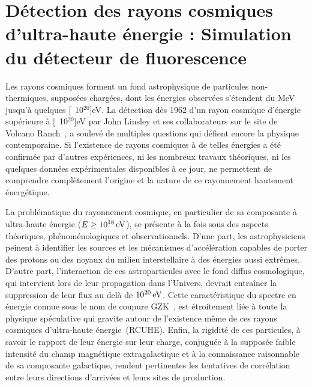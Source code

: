 \documentclass[10pt,a4paper,twoside]{report}
\begin{document}
\renewcommand{\chaptername}{Projet}

\setcounter{chapter}{3}
\chapter{Détection des rayons cosmiques d'ultra-haute énergie :
  Simulation du détecteur de fluorescence}
\label{projet::opa1}

Les rayons cosmiques forment un fond astrophysique de particules
non-thermiques, supposées chargées, dont les énergies observées
s'étendent du MeV jusqu'à quelques \unit[10$^\text{20}$]{eV}. La détection
dès 1962 d'un rayon cosmique d'énergie supérieure à
\unit[10$^\text{20}$]{eV} par John Linsley et ses collaborateurs sur le
site de Volcano Ranch~\cite{linsley}, a soulevé de
multiples questions qui défient encore la physique contemporaine. Si
l'existence de rayons cosmiques à de telles énergies a été confirmée
par d'autres expériences, ni les nombreux travaux théoriques, ni les
quelques données expérimentales disponibles à ce jour, ne permettent
de comprendre complètement l'origine et la nature de ce rayonnement
hautement énergétique.

La problématique du rayonnement cosmique, en particulier de sa
composante à ultra-haute énergie ($E\geq\unit[10^{18}]{eV}$), se
présente à la fois sous des aspects théoriques,
phé\-no\-mé\-no\-lo\-gi\-ques et observationnels. D'une part, les
astrophysiciens peinent à identifier les sources et les mécanismes
d'accélération capables de porter des protons ou des noyaux du milieu
interstellaire à des énergies aussi extrêmes. D'autre part,
l'interaction de ces astroparticules avec le fond diffus cosmologique,
qui intervient lors de leur propagation dans l'Univers, devrait
entraîner la suppression de leur flux au delà de
$\unit[10^{20}]{eV}$. Cette caractéristique du spectre en énergie
connue sous le nom de coupure GZK~\cite{greisen, zatsepin}, est
étroitement liée à toute la physique spéculative qui gravite autour de
l'existence même de ces rayons cosmiques d'ultra-haute
énergie~(RCUHE). Enfin, la rigidité de ces particules, à savoir le
rapport de leur énergie sur leur charge, conjuguée à la supposée
faible intensité du champ magnétique extragalactique et à la
connaissance raisonnable de sa composante galactique, rendent
pertinentes les tentatives de corrélation entre leurs directions
d'arrivées et leurs sites de production.
\end{document}
